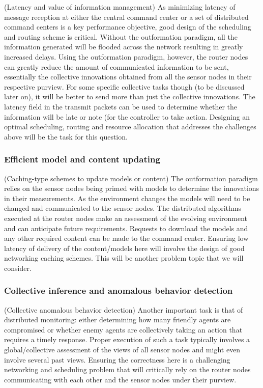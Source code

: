 \documentclass[12pt,letterpaper]{article}
\begin{document}
(Latency and value of information management) As minimizing latency of message reception at either the central command center or a set of distributed command centers is a key performance objective, good design of the scheduling and routing scheme is critical. Without the outformation paradigm, all the information generated will be flooded across the network resulting in greatly increased delays. Using the outformation paradigm, however, the router nodes can greatly reduce the amount of communicated information to be sent, essentially the collective innovations obtained from all the sensor nodes in their respective purview. For some specific collective tasks though (to be discussed later on), it will be better to send more than just the collective innovations. The latency field in the transmit packets can be used to determine whether the information will be late or note (for the controller to take action. Designing an optimal scheduling, routing and resource allocation that addresses the challenges above will be the task for this question.

\subsubsection{Efficient model and content updating}\label{subsec:caching}

(Caching-type schemes to update models or content) The outformation paradigm relies on the sensor nodes being primed with models to determine the innovations in their measurements. As the environment changes the models will need to be changed and communicated to the sensor nodes. The distributed algorithms executed at the router nodes make an assessment of the evolving environment and can anticipate future requirements. Requests to download the models and any other required content can be made to the command center. Ensuring low latency of delivery of the content/models here will involve the design of good networking caching schemes. This will be another problem topic that we will consider.

\subsubsection{Collective inference and anomalous behavior detection}\label{subsec:inference}

(Collective anomalous behavior detection) Another important task is that of distributed monitoring: either determining how many friendly agents are compromised or whether enemy agents are collectively taking an action that requires a timely response. Proper execution of such a task typically involves a global/collective assessment of the views of all sensor nodes and might even involve several past views. Ensuring the correctness here is a challenging networking and scheduling problem that will critically rely on the router nodes communicating with each other and the sensor nodes under their purview. 
\end{document}
